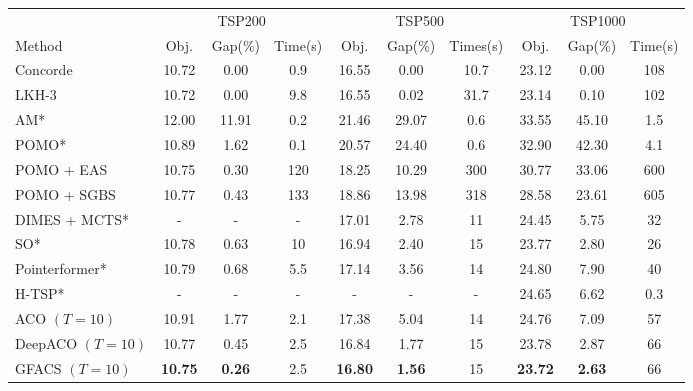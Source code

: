 \begin{tabular}{lccccccccc}
\toprule[1.0pt]
 & \multicolumn{3}{c}{TSP200} & \multicolumn{3}{c}{TSP500} & \multicolumn{3}{c}{TSP1000} 
\\ 
\cmidrule[0.5pt](lr{0.2em}){2-4}
\cmidrule[0.5pt](lr{0.2em}){5-7}
\cmidrule[0.5pt](lr{0.2em}){8-10}
Method & Obj. & Gap(\%)
 & Time(s) & Obj. & Gap(\%) & Times(s)
 & Obj. & Gap(\%) & Time(s) 
\\ 
\midrule[1.0pt]
Concorde & 10.72 & 0.00 & 0.9 & 16.55 & 0.00 & 10.7 & 23.12 & 0.00 & 108 
\\
LKH-3 & 10.72 & 0.00 & 9.8 & 16.55 & 0.02 & 31.7 & 23.14 & 0.10 & 102 
\\
\cmidrule(lr{0.1em}){1-1}
\cmidrule(lr{0.1em}){2-4}
\cmidrule(lr{0.1em}){5-7}
\cmidrule(lr{0.1em}){8-10}
AM{*} & 12.00 & 11.91 & 0.2 & 21.46 & 29.07 & 0.6 & 33.55 & 45.10 & 1.5 
\\
POMO{*} & 10.89 & 1.62 & 0.1 & 20.57 & 24.40 & 0.6 & 32.90 & 42.30 & 4.1 

\\
POMO + EAS & 10.75 & 0.30 & 120 & 18.25 & 10.29 & 300 & 30.77 & 33.06 & 600
\\
POMO + SGBS & 10.77 & 0.43 & 133 & 18.86 & 13.98 & 318 & 28.58 & 23.61 & 605 
\\
DIMES + MCTS{*} & - & - & - & 17.01 & 2.78 & 11 & 24.45 & 5.75 & 32 
\\
SO{*} & 10.78 & 0.63 & 10 & 16.94 & 2.40 & 15 & 23.77 & 2.80 & 26 
\\
Pointerformer{*} & 10.79 & 0.68 & 5.5 & 17.14 & 3.56 & 14 & 24.80 & 7.90 & 40 
\\
H-TSP{*} & - & - & - & - & - & - & 24.65 & 6.62 & 0.3 
\\
\cmidrule(lr{0.1em}){1-1}
\cmidrule(lr{0.1em}){2-4}
\cmidrule(lr{0.1em}){5-7}
\cmidrule(lr{0.1em}){8-10}
ACO {$(T = 10)$} & 10.91 & 1.77 & 2.1 & 17.38 & 5.04 & 14 & 24.76 & 7.09 & 57 
\\
DeepACO {$(T = 10)$} & 10.77 & 0.45 & 2.5 & 16.84 & 1.77 & 15 & 23.78 & 2.87 & 66
\\ 
GFACS {$(T = 10)$} & \textbf{10.75} & \textbf{0.26} & 2.5 & \textbf{16.80} & \textbf{1.56} & 15 & \textbf{23.72} & \textbf{2.63} & 66
\\
\bottomrule[1.0pt]
\end{tabular}
